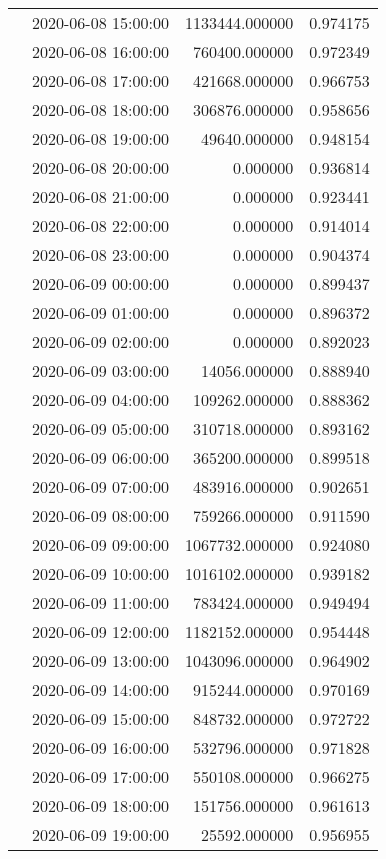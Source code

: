 \begin{tabular}{llrr}
 & 2020-06-08 15:00:00 & 1133444.000000 & 0.974175 \\
 & 2020-06-08 16:00:00 & 760400.000000 & 0.972349 \\
 & 2020-06-08 17:00:00 & 421668.000000 & 0.966753 \\
 & 2020-06-08 18:00:00 & 306876.000000 & 0.958656 \\
 & 2020-06-08 19:00:00 & 49640.000000 & 0.948154 \\
 & 2020-06-08 20:00:00 & 0.000000 & 0.936814 \\
 & 2020-06-08 21:00:00 & 0.000000 & 0.923441 \\
 & 2020-06-08 22:00:00 & 0.000000 & 0.914014 \\
 & 2020-06-08 23:00:00 & 0.000000 & 0.904374 \\
 & 2020-06-09 00:00:00 & 0.000000 & 0.899437 \\
 & 2020-06-09 01:00:00 & 0.000000 & 0.896372 \\
 & 2020-06-09 02:00:00 & 0.000000 & 0.892023 \\
 & 2020-06-09 03:00:00 & 14056.000000 & 0.888940 \\
 & 2020-06-09 04:00:00 & 109262.000000 & 0.888362 \\
 & 2020-06-09 05:00:00 & 310718.000000 & 0.893162 \\
 & 2020-06-09 06:00:00 & 365200.000000 & 0.899518 \\
 & 2020-06-09 07:00:00 & 483916.000000 & 0.902651 \\
 & 2020-06-09 08:00:00 & 759266.000000 & 0.911590 \\
 & 2020-06-09 09:00:00 & 1067732.000000 & 0.924080 \\
 & 2020-06-09 10:00:00 & 1016102.000000 & 0.939182 \\
 & 2020-06-09 11:00:00 & 783424.000000 & 0.949494 \\
 & 2020-06-09 12:00:00 & 1182152.000000 & 0.954448 \\
 & 2020-06-09 13:00:00 & 1043096.000000 & 0.964902 \\
 & 2020-06-09 14:00:00 & 915244.000000 & 0.970169 \\
 & 2020-06-09 15:00:00 & 848732.000000 & 0.972722 \\
 & 2020-06-09 16:00:00 & 532796.000000 & 0.971828 \\
 & 2020-06-09 17:00:00 & 550108.000000 & 0.966275 \\
 & 2020-06-09 18:00:00 & 151756.000000 & 0.961613 \\
 & 2020-06-09 19:00:00 & 25592.000000 & 0.956955 \\

\end{tabular}
